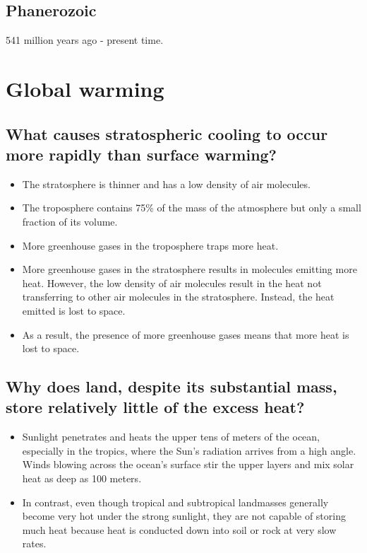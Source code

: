 \documentclass[11pt]{article}
\begin{document}
\subsection{Phanerozoic}
\label{sec:org5a025f6}
541 million years ago - present time.


\section{Global warming}
\label{sec:org954a4e7}

\subsection{What causes stratospheric cooling to occur more rapidly than surface warming?}
\label{sec:org9ceb488}
\begin{itemize}
\item The stratosphere is thinner and has a low density of air molecules.
\item The troposphere contains 75\% of the mass of the atmosphere but only a small fraction of its volume.
\item More greenhouse gases in the troposphere traps more heat.
\item More greenhouse gases in the stratosphere results in molecules emitting more heat. However, the low density of air molecules result in the heat not transferring to other air molecules in the stratosphere. Instead, the heat emitted is lost to space.
\item As a result, the presence of more greenhouse gases means that more heat is lost to space.
\end{itemize}

\subsection{Why does land, despite its substantial mass, store relatively little of the excess heat?}
\label{sec:org85ba2ce}
\begin{itemize}
\item Sunlight penetrates and heats the upper tens of meters of the ocean, especially in the tropics, where the Sun's radiation arrives from a high angle. Winds blowing across the ocean's surface stir the upper layers and mix solar heat as deep as 100 meters.
\item In contrast, even though tropical and subtropical landmasses generally become very hot under the strong sunlight, they are not capable of storing much heat because heat is conducted down into soil or rock at very slow rates.
\end{itemize}
\end{document}

